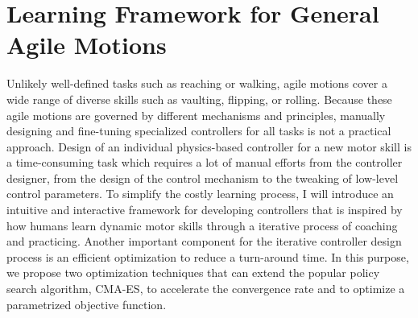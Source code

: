 \section{Learning Framework for General Agile Motions}
Unlikely well-defined tasks such as reaching or walking,
agile motions cover a wide range of diverse skills such as vaulting, flipping,
or rolling.
Because these agile motions are governed by different mechanisms and
principles, manually designing and fine-tuning specialized controllers for all
tasks is not a practical approach.
Design of an individual physics-based controller for a new motor skill is 
a time-consuming task  which requires a lot of manual efforts from the controller
designer, from the design of the control mechanism to the tweaking of low-level
control parameters. 
To simplify the costly learning process, I will introduce an intuitive and 
interactive framework for developing controllers that is inspired by
how humans learn dynamic motor skills through a iterative process of coaching
and practicing.
Another important component for the iterative controller design process
is an efficient optimization to reduce a turn-around time.
In this purpose, we propose two optimization techniques that can extend the
popular policy search algorithm, CMA-ES, to accelerate the convergence rate
and to optimize a parametrized objective function.

